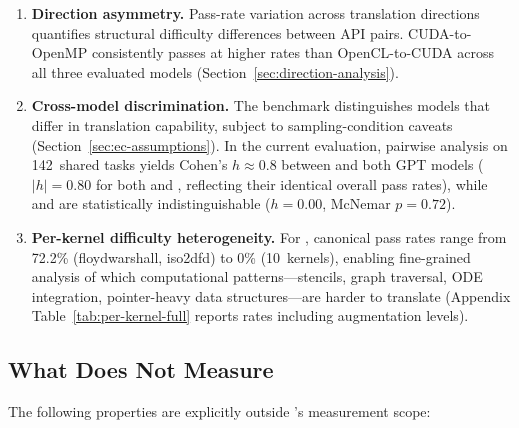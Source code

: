\begin{enumerate}
  \item \textbf{Direction asymmetry.} Pass-rate variation across translation 
    directions quantifies structural difficulty differences between API pairs. 
    CUDA-to-OpenMP consistently passes at higher rates than OpenCL-to-CUDA 
    across all three evaluated models (Section~\ref{sec:direction-analysis}).
    \item \textbf{Cross-model discrimination.} The benchmark distinguishes models that differ in translation capability, subject to sampling-condition caveats (Section~\ref{sec:ec-assumptions}). In the current evaluation, pairwise analysis on 142~shared tasks yields Cohen's $h \approx 0.8$ between \qwenshort{} and both GPT models ($|h| = 0.80$ for both \gptnew{} and \codex{}, reflecting their identical overall pass rates), while \gptnew{} and \codex{} are statistically indistinguishable ($h = 0.00$, McNemar $p = 0.72$).
    
    \item \textbf{Per-kernel difficulty heterogeneity.} For \qwenshort{}, canonical pass rates range from 72.2\% (floydwarshall, iso2dfd) to 0\% (10~kernels), enabling fine-grained analysis of which computational patterns---stencils, graph traversal, ODE integration, pointer-heavy data structures---are harder to translate (Appendix Table~\ref{tab:per-kernel-full} reports rates including augmentation levels).

\end{enumerate}

\subsection{What \parbench{} Does Not Measure}
\label{sec:ec-not-measures}

The following properties are explicitly outside \parbench{}'s measurement scope:

